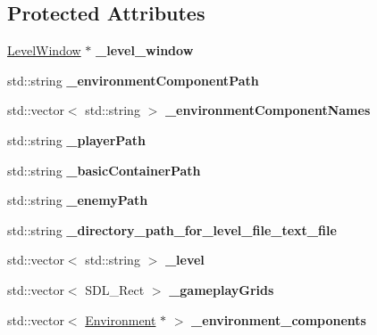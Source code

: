 \subsection*{Protected Attributes}
\begin{DoxyCompactItemize}
\item 
\hypertarget{class_level_aa13108f91760be62ede356de5d672053}{}\label{class_level_aa13108f91760be62ede356de5d672053} 
\hyperlink{class_level_window}{Level\+Window} $\ast$ {\bfseries \+\_\+level\+\_\+window}
\item 
\hypertarget{class_level_aada31895cc425712ed153b27149a4a3e}{}\label{class_level_aada31895cc425712ed153b27149a4a3e} 
std\+::string {\bfseries \+\_\+environment\+Component\+Path}
\item 
\hypertarget{class_level_aea358fcbb8843324015450d6d64c3fca}{}\label{class_level_aea358fcbb8843324015450d6d64c3fca} 
std\+::vector$<$ std\+::string $>$ {\bfseries \+\_\+environment\+Component\+Names}
\item 
\hypertarget{class_level_a8d2f34dc13ca40b4afb67a54dfe8847e}{}\label{class_level_a8d2f34dc13ca40b4afb67a54dfe8847e} 
std\+::string {\bfseries \+\_\+player\+Path}
\item 
\hypertarget{class_level_a2c08183be323a0c31f7d02b93d68e098}{}\label{class_level_a2c08183be323a0c31f7d02b93d68e098} 
std\+::string {\bfseries \+\_\+basic\+Container\+Path}
\item 
\hypertarget{class_level_a78e37613bc65b80bc5cf71dc652b259f}{}\label{class_level_a78e37613bc65b80bc5cf71dc652b259f} 
std\+::string {\bfseries \+\_\+enemy\+Path}
\item 
\hypertarget{class_level_a68a007eb38444afd0536f038f85df306}{}\label{class_level_a68a007eb38444afd0536f038f85df306} 
std\+::string {\bfseries \+\_\+directory\+\_\+path\+\_\+for\+\_\+level\+\_\+file\+\_\+text\+\_\+file}
\item 
\hypertarget{class_level_a78c0252d860e02697e3c417e1ca173c6}{}\label{class_level_a78c0252d860e02697e3c417e1ca173c6} 
std\+::vector$<$ std\+::string $>$ {\bfseries \+\_\+level}
\item 
\hypertarget{class_level_a03f66ffad65acc6c5d46b654f27e7c81}{}\label{class_level_a03f66ffad65acc6c5d46b654f27e7c81} 
std\+::vector$<$ S\+D\+L\+\_\+\+Rect $>$ {\bfseries \+\_\+gameplay\+Grids}
\item 
\hypertarget{class_level_a1af5cc7db2c573b6f14d36f5ba19d609}{}\label{class_level_a1af5cc7db2c573b6f14d36f5ba19d609} 
std\+::vector$<$ \hyperlink{class_environment}{Environment} $\ast$ $>$ {\bfseries \+\_\+environment\+\_\+components}

\end{DoxyCompactItemize}
